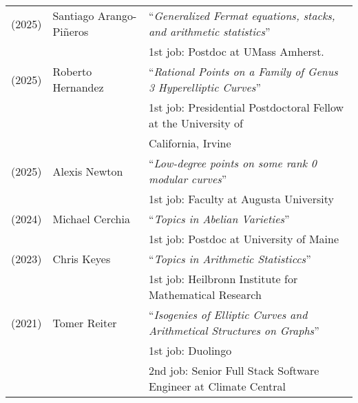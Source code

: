 \documentclass[margin,line]{res}
\newcommand{\defi}[1]{\textsf{#1}} 				%
\begin{document}
\begin{resume}
\begin{tabular}{lll}
  (2025) & \defi{Santiago Arango-Pi\~neros} & ``\emph{Generalized Fermat equations, stacks, and arithmetic statistics}'' \\
         && \hspace{4 pt} 1st job: Postdoc at UMass Amherst.
            \vspace{4pt}\\
  (2025) & \defi{Roberto Hernandez} & ``\emph{Rational Points on a Family of Genus 3 Hyperelliptic Curves}'' \\
         && \hspace{4 pt} 1st job: Presidential Postdoctoral Fellow at the University of \\
  && \hspace{4 pt} California, Irvine
         \vspace{4pt}\\  
  (2025) & \defi{Alexis Newton} & ``\emph{Low-degree points on some rank 0 modular curves}'' \\
         && \hspace{4 pt} 1st job: Faculty at Augusta University
         \vspace{4pt}\\
  (2024) & \defi{Michael Cerchia} &``\emph{Topics in Abelian Varieties}'' \\
         && \hspace{4 pt} 1st job: Postdoc at University of Maine
    \vspace{4pt}\\
  (2023) & \defi{Chris Keyes} &  ``\emph{Topics in Arithmetic Statisticcs}'' \\
         && \hspace{4 pt} 1st job: Heilbronn Institute for Mathematical Research
         \vspace{4pt}\\
  (2021) & \defi{Tomer Reiter} &  ``\emph{Isogenies of Elliptic Curves and Arithmetical Structures on Graphs}'' \\
           && \hspace{4 pt} 1st job: Duolingo\\
         && \hspace{4 pt} 2nd job: Senior Full Stack Software Engineer at Climate Central      \\         

\end{tabular}
\end{resume}
\end{document}
